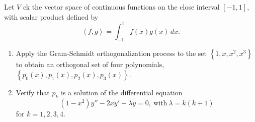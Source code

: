 \documentclass{article}
\begin{document}
Let $V$ ck the vector space of continuous functions on the close interval  $[-1,1]$, with scalar product defined by
 \[
\left<f,g \right> = \int_{-1}^{1} f(x)g(x)\,dx 
.\] 

\begin{enumerate}[label=(\alph*)]
  \item Apply the Gram-Schmidt orthogonalization process to the set $\left\{ 1,x,x^{2},x^{3} \right\} $ to obtain an orthogonal set of four polynomials, $\left\{ p_0(x),p_1(x),p_2(x),p_3(x) \right\} $. 
    \item Verify that $p_k$ is a solution of the differential equation 
      \[
        (1-x^{2})y''-2xy'+\lambda y = 0,\ \text{with}\ \lambda=k(k+1)
      \] for $k=1,2,3,4$.  
\end{enumerate}
\end{document}
